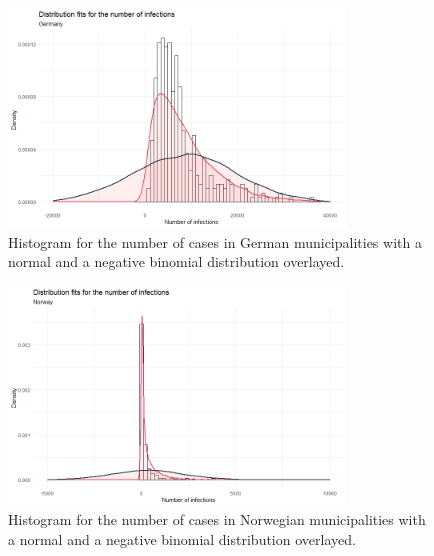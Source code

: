 \begin{figure}[H]
  \centering
  \includegraphics[width = 0.8\textwidth]{distrfit_germany.png}  
  \caption{Histogram for the number of cases in German municipalities with a normal and a negative binomial distribution overlayed.}
  \label{fitDistrGermany}
\end{figure}
\begin{figure}[H]
  \centering
  \includegraphics[width = 0.8\textwidth]{distrfit_norway.png}
  \caption{Histogram for the number of cases in Norwegian municipalities with a normal and a negative binomial distribution overlayed.}
  \label{fitDistrNorway}
\end{figure}
\clearpage
